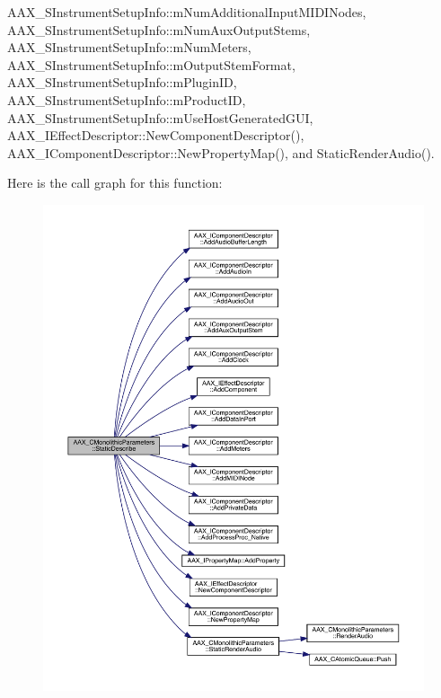 A\+A\+X\+\_\+\+S\+Instrument\+Setup\+Info\+::m\+Num\+Additional\+Input\+M\+I\+D\+I\+Nodes, A\+A\+X\+\_\+\+S\+Instrument\+Setup\+Info\+::m\+Num\+Aux\+Output\+Stems, A\+A\+X\+\_\+\+S\+Instrument\+Setup\+Info\+::m\+Num\+Meters, A\+A\+X\+\_\+\+S\+Instrument\+Setup\+Info\+::m\+Output\+Stem\+Format, A\+A\+X\+\_\+\+S\+Instrument\+Setup\+Info\+::m\+Plugin\+ID, A\+A\+X\+\_\+\+S\+Instrument\+Setup\+Info\+::m\+Product\+ID, A\+A\+X\+\_\+\+S\+Instrument\+Setup\+Info\+::m\+Use\+Host\+Generated\+G\+UI, A\+A\+X\+\_\+\+I\+Effect\+Descriptor\+::\+New\+Component\+Descriptor(), A\+A\+X\+\_\+\+I\+Component\+Descriptor\+::\+New\+Property\+Map(), and Static\+Render\+Audio().

Here is the call graph for this function\+:
\nopagebreak
\begin{figure}[H]
\begin{center}
\leavevmode
\includegraphics[width=350pt]{a01969_a69f9b80a70ecc6b7b2a7eec372d2502a_cgraph}
\end{center}
\end{figure}
\mbox{\label{a01969_a0384cc1e3c40ca75ffbe76b89bd12c3c}} 
